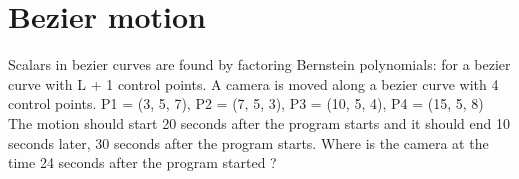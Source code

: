\documentclass[12pt,fleqn,reqno]{article}
\begin{document}
\section{Bezier motion}
Scalars in bezier curves are found by factoring Bernstein polynomials:
for a bezier curve with L + 1 control points. A camera is moved along a bezier curve with 4 control points.
P1 = (3, 5, 7), P2 = (7, 5, 3), P3 = (10, 5, 4), P4 = (15, 5, 8)
The motion should start 20 seconds after the program starts and it should end 10 seconds later, 30 seconds after the program starts.
Where is the camera at the time 24 seconds after the program started ?
\end{document}
